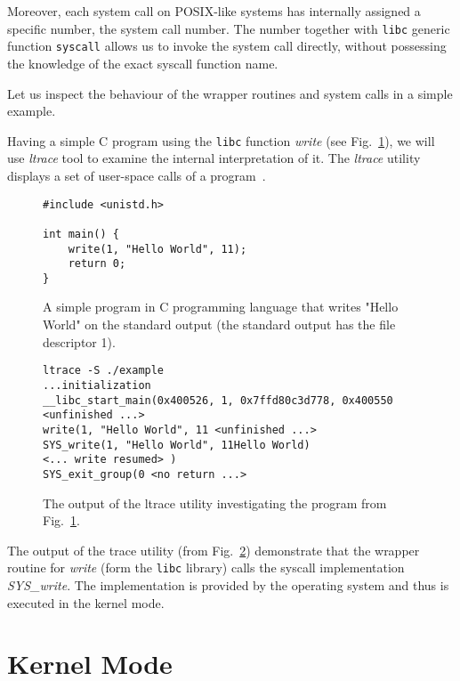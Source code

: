 Moreover, each system call on POSIX-like systems has internally assigned a specific number, the system call number. The number together with \texttt{libc} generic function \texttt{syscall} allows us to invoke the system call directly, without possessing the knowledge of the exact syscall function name.

Let us inspect the behaviour of the wrapper routines and system calls in a simple example.

Having a simple C program using the \texttt{libc} function \textit{write} (see Fig.~\ref{example:HelloWorld}), we will use \textit{ltrace} tool to examine the internal interpretation of it. The \textit{ltrace} utility displays a set of user-space calls of a program~\cite{ltrace}.


\begin{figure}[!ht]
\begin{lstlisting}[style=C]
#include <unistd.h>

int main() {
    write(1, "Hello World", 11);
    return 0;
}
\end{lstlisting}
\caption{
        A simple program in C programming language that writes "Hello World" on the standard output (the standard output has the file descriptor 1).
    }
  \label{example:HelloWorld}
\end{figure}


\begin{figure}[h!]
\begin{lstlisting}[style=DOS]
ltrace -S ./example
...initialization
__libc_start_main(0x400526, 1, 0x7ffd80c3d778, 0x400550 <unfinished ...>
write(1, "Hello World", 11 <unfinished ...>
SYS_write(1, "Hello World", 11Hello World) 
<... write resumed> )                        
SYS_exit_group(0 <no return ...>

\end{lstlisting}
\caption{
       The output of the ltrace utility investigating the program from Fig.~\ref{example:HelloWorld}.
}
  \label{example:ltrace}
\end{figure}

The output of the trace utility (from Fig.~\ref{example:ltrace}) demonstrate that the wrapper routine for \textit{write} (form the \texttt{libc} library) calls the syscall implementation \textit{SYS\_write}. The implementation is provided by the operating system and thus is executed in the kernel mode.

\section{ Kernel Mode }

